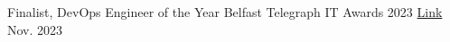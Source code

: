 \begin{cvhonors}

 \cvhonor
   {Finalist, DevOps Engineer of the Year} %
   {Belfast Telegraph IT Awards 2023} %
   {\href{https://www.belfasttelegraph.co.uk/events/belfast-telegraph-it-awards-2023-almost-70-companies-and-individuals-shortlisted/a544085975.html}{Link}} %
   {Nov. 2023} %

\end{cvhonors}